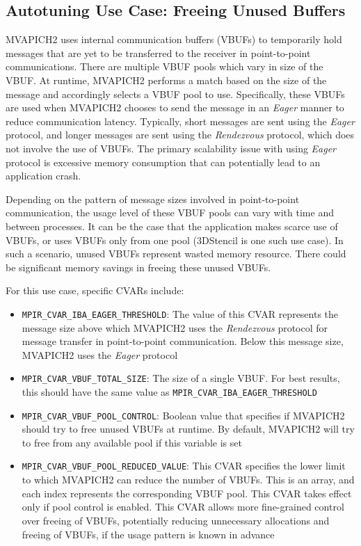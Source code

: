 \subsection{Autotuning Use Case: Freeing Unused Buffers}
MVAPICH2 uses internal communication buffers (VBUFs) to temporarily hold messages that are yet to be transferred to the receiver in point-to-point communications. There are multiple VBUF pools which vary in size of the VBUF. At runtime, MVAPICH2 performs a match based on the size of the message and accordingly selects a VBUF pool to use. Specifically, these VBUFs are used when MVAPICH2 chooses to send the message in an \emph{Eager} manner to reduce communication latency. Typically, short messages are sent using the \emph{Eager} protocol, and longer messages are sent using the \emph{Rendezvous} protocol, which does not involve the use of VBUFs. The primary scalability issue with using \emph{Eager} protocol is excessive memory consumption that can potentially lead to an application crash. \par
Depending on the pattern of message sizes involved in point-to-point communication, the usage level of these VBUF pools can vary with time and between processes. It can be the case that the application makes scarce use of VBUFs, or uses VBUFs only from one pool (3DStencil is one such use case). In such a scenario, unused VBUFs represent wasted memory resource. There could be significant memory savings in freeing these unused VBUFs.

For this use case, specific CVARs include:
\begin{itemize}
  \item \verb+MPIR_CVAR_IBA_EAGER_THRESHOLD+: The value of this CVAR represents the message size above which MVAPICH2 uses the \emph{Rendezvous} protocol for message transfer in point-to-point communication. Below this message size, MVAPICH2 uses the \emph{Eager} protocol
  \item \verb+MPIR_CVAR_VBUF_TOTAL_SIZE+: The size of a single VBUF. For best results, this should have the same value as \verb+MPIR_CVAR_IBA_EAGER_THRESHOLD+
  \item \verb+MPIR_CVAR_VBUF_POOL_CONTROL+: Boolean value that specifies if MVAPICH2 should try to free unused VBUFs at runtime. By default, MVAPICH2 will try to free from any available pool if this variable is set
  \item \verb+MPIR_CVAR_VBUF_POOL_REDUCED_VALUE+: This CVAR specifies the lower limit to which MVAPICH2 can reduce the number of VBUFs. This is an array, and each index represents the corresponding VBUF pool. This CVAR takes effect only if  pool control is enabled. This CVAR allows more fine-grained control over freeing of VBUFs, potentially reducing unnecessary allocations and freeing of VBUFs, if the usage pattern is known in advance
\end{itemize}

